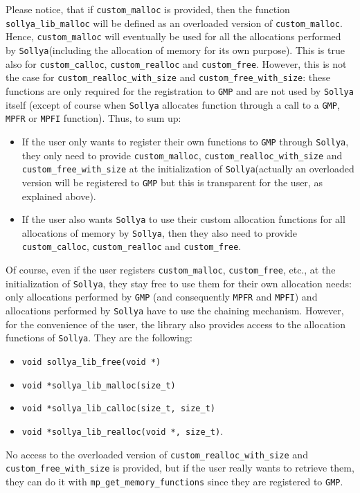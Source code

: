 \documentclass[a4paper]{article}
\newcommand{\sollya}{\texttt{Sollya}\xspace}
\begin{document}
Please notice, that if \verb|custom_malloc| is provided, then the function \verb|sollya_lib_malloc| will be defined as an overloaded version of \verb|custom_malloc|. Hence, \verb|custom_malloc| will eventually be used for all the allocations performed by \sollya (including the allocation of memory for its own purpose). This is true also for \verb|custom_calloc|, \verb|custom_realloc| and \verb|custom_free|. However, this is not the case for \verb|custom_realloc_with_size| and \verb|custom_free_with_size|: these functions are only required for the registration to \verb|GMP| and are not used by \sollya itself (except of course when \sollya allocates function through a call to a \verb|GMP|, \verb|MPFR| or \verb|MPFI| function). Thus, to sum up:
\begin{itemize}
\item If the user only wants to register their own functions to \verb|GMP| through \sollya, they  only need to provide \verb|custom_malloc|, \verb|custom_realloc_with_size| and \verb|custom_free_with_size| at the initialization of \sollya (actually an overloaded version will be registered to \verb|GMP| but this is transparent for the user, as explained above).
\item If the user also wants \sollya to use their custom allocation functions for all allocations of memory by \sollya, then they also need to provide \verb|custom_calloc|, \verb|custom_realloc| and \verb|custom_free|.
\end{itemize}

Of course, even if the user registers \verb|custom_malloc|, \verb|custom_free|, etc., at the initialization of \sollya, they stay free to use them for their own allocation needs: only allocations performed by \verb|GMP| (and consequently \verb|MPFR| and \verb|MPFI|) and allocations performed by \sollya have to use the chaining mechanism. However, for the convenience of the user, the library also provides access to the allocation functions of \sollya. They are the following:
\begin{itemize}
\item \verb|void sollya_lib_free(void *)|
\item \verb|void *sollya_lib_malloc(size_t)|
\item \verb|void *sollya_lib_calloc(size_t, size_t)|
\item \verb|void *sollya_lib_realloc(void *, size_t)|.
\end{itemize}
No access to the overloaded version of \verb|custom_realloc_with_size| and \verb|custom_free_with_size| is provided, but if the user really wants to retrieve them, they can do it with \verb|mp_get_memory_functions| since they are registered to \verb|GMP|.
\end{document}
